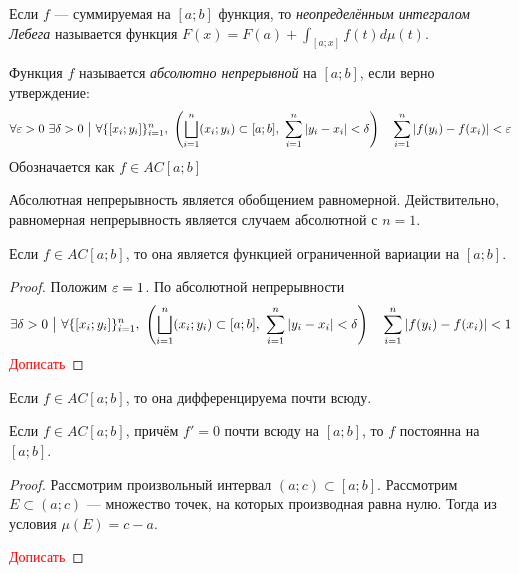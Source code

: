 \begin{definition}
	Если $f$ --- суммируемая на $[a; b]$ функция, то \textit{неопределённым интегралом Лебега} называется функция $F(x) = F(a) + \int_{[a; x]} f(t)d\mu(t)$.
\end{definition}

\begin{definition}
	Функция $f$ называется \textit{абсолютно непрерывной} на $[a; b]$, если верно утверждение:
	\[
		\forall \eps > 0\ \exists \delta > 0 \such \forall \{[x_i; y_i]\}_{i = 1}^n,\ \ps{\bscup_{i = 1}^n (x_i; y_i) \subset [a; b],\ \sum_{i = 1}^n |y_i - x_i| < \delta} \quad \sum_{i = 1}^n |f(y_i) - f(x_i)| < \eps
	\]
	Обозначается как $f \in AC[a; b]$
\end{definition}

\begin{note}
	Абсолютная непрерывность является обобщением равномерной. Действительно, равномерная непрерывность является случаем абсолютной с $n = 1$.
\end{note}

\begin{lemma}
	Если $f \in AC[a; b]$, то она является функцией ограниченной вариации на $[a; b]$.
\end{lemma}

\begin{proof}
	Положим $\varepsilon = 1$. По абсолютной непрерывности
	\[
		\exists \delta > 0 \ \big|\  \forall \{[x_i; y_i]\}_{i = 1}^n,\ \left(\bigsqcup_{i = 1}^n (x_i; y_i) \subset [a; b],\ \sum_{i = 1}^n |y_i - x_i| < \delta\right) \quad \sum_{i = 1}^n |f(y_i) - f(x_i)| < 1
	\]
	\textcolor{red}{Дописать}
\end{proof}

\begin{corollary}
	Если $f \in AC[a; b]$, то она дифференцируема почти всюду.
\end{corollary}

\begin{lemma}
	Если $f \in AC[a; b]$, причём $f' = 0$ почти всюду на $[a; b]$, то $f$ постоянна на $[a; b]$.
\end{lemma}

\begin{proof}
	Рассмотрим произвольный интервал $(a; c) \subset [a; b]$. Рассмотрим $E \subset (a; c)$ --- множество точек, на которых производная равна нулю. Тогда из условия $\mu(E) = c - a$.
	
	\textcolor{red}{Дописать}
\end{proof}

